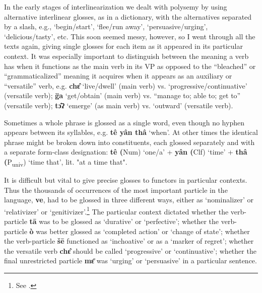 In the early stages of interlinearization we dealt with polysemy by
using alternative interlinear glosses, as in a dictionary, with the
alternatives separated by a slash, e.g., `begin/start', `flee/run away',
`persuasive/urging', `delicious/tasty', etc. This soon seemed messy,
however, so I went through all the texts again, giving single glosses
for each item as it appeared in its particular context. It was
especially important to distinguish between the meaning a verb has when
it functions as the main verb in its VP as opposed to the ``bleached'' or
``grammaticalized'' meaning it acquires when it appears as an auxiliary or
``versatile'' verb, e.g. \textbf{chɛ̂} `live/dwell' (main verb) vs.
`progressive/continuative' (versatile verb); \textbf{g̈a} `get/obtain'
(main verb) vs. ``manage to; able to; get to'' (versatile verb);
\textbf{tɔ̂ʔ} `emerge' (as main verb) vs. `outward' (versatile verb).

Sometimes a whole phrase is glossed as a single word, even though no
hyphen appears between its syllables, e.g. \textbf{tê yân thâ} `when'.
At other times the identical phrase might be broken down into
constituents, each glossed separately and with a separate form-class
designation: \textbf{tê (}Num) `one/a' + \textbf{yân (}Clf) `time' +
\textbf{thâ (}P\textsubscript{univ}) `time that', lit. "at a time that".

It is difficult but vital to give precise glosses to functors in
particular contexts. Thus the thousands of occurrences of the most
important particle in the language, \textbf{ve}, had to be glossed in
three different ways, either as `nominalizer' or `relativizer' or
`genitivizer'.\footnote{See \citet{matisoff1972}.} The particular context
dictated whether the verb-particle \textbf{tā} was to be glossed as
`durative' or `perfective'; whether the verb-particle \textbf{ò} was
better glossed as `completed action' or `change of state'; whether the
verb-particle \textbf{šē} functioned as `inchoative' or as a `marker of
regret'; whether the versatile verb \textbf{chɛ̂} should be called
`progressive' or `continuative'; whether the final unrestricted particle
\textbf{mɛ̄} was `urging' or `persuasive' in a particular sentence.

